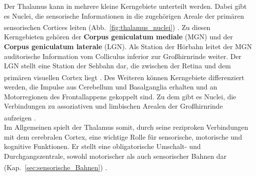 \documentclass[12pt,a4paper,pdftex]{article}
\begin{document}
\noindent Der Thalamus kann in mehrere kleine Kerngebiete unterteilt werden. Dabei gibt es Nuclei, die sensorische Informationen in die zugehörigen Areale der primären sensorischen Cortices leiten (Abb.~\ref{fig:thalamus_nuclei}) \textsuperscript{\cite[12]{crossman2014neuroanatomy}}. Zu diesen Kerngebieten gehören der \textbf{Corpus geniculatum mediale} (MGN) und der \textbf{Corpus geniculatum laterale} (LGN). Als Station der Hörbahn leitet der MGN auditorische Information vom Colliculus inferior zur Großhirnrinde weiter. Der LGN stellt eine Station der Sehbahn dar, die zwischen der Retina und dem primären visuellen Cortex liegt \textsuperscript{\cite[14]{penzlin2005tierphys}}. Des Weiteren können Kerngebiete differenziert werden, die Impulse aus Cerebellum und Basalganglia erhalten und an Motorregionen des Frontallappens gekoppelt sind. Zu dem gibt es Nuclei, die Verbindungen zu assoziativen und limbischen Arealen der Großhirnrinde aufzeigen \textsuperscript{\cite[12]{crossman2014neuroanatomy}}.\\
\noindent Im Allgemeinen spielt der Thalamus somit, durch seine reziproken Verbindungen mit dem cerebralen Cortex, eine wichtige Rolle für sensorische, motorische und kognitive Funktionen. Er stellt eine obligatorische Umschalt- und Durchgangszentrale, sowohl motorischer als auch sensorischer Bahnen dar (Kap.~\ref{sec:sensorische_Bahnen}) \textsuperscript{\cite[6]{storch2012lehrbuchzoo}}.
\end{document}
